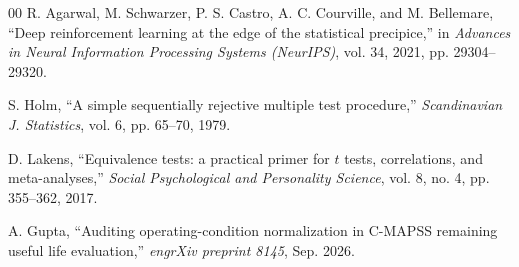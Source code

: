 \documentclass[conference]{IEEEtran}
\begin{document}
\begin{thebibliography}{00}
 R. Agarwal, M. Schwarzer, P. S. Castro, A. C. Courville, and M. Bellemare, ``Deep reinforcement learning at the edge of the statistical precipice,'' in \emph{Advances in Neural Information Processing Systems (NeurIPS)}, vol. 34, 2021, pp. 29304--29320.

 S. Holm, ``A simple sequentially rejective multiple test procedure,'' \emph{Scandinavian J. Statistics}, vol. 6, pp. 65--70, 1979.

 D. Lakens, ``Equivalence tests: a practical primer for $t$ tests, correlations, and meta-analyses,'' \emph{Social Psychological and Personality Science}, vol. 8, no. 4, pp. 355--362, 2017.

 A. Gupta, ``Auditing operating-condition normalization in C-MAPSS remaining useful life evaluation,'' \emph{engrXiv preprint 8145}, Sep. 2026.

\end{thebibliography}
\end{document}
